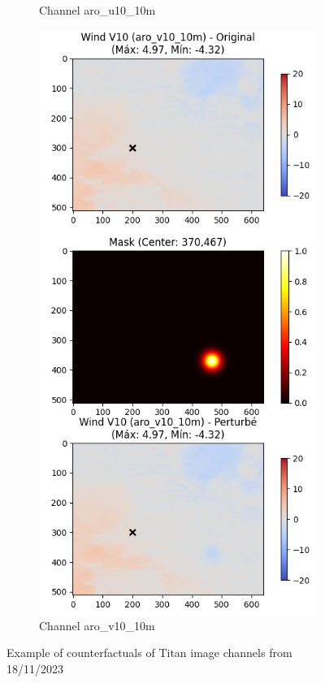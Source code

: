 \begin{figure}[h]
\begin{subfigure}[b]{0.32\textwidth}
        \caption{Channel aro\_u10\_10m}
        \label{fig:titan_perturbed_aro_u10}
    \end{subfigure}
    \hfill
    \begin{subfigure}[b]{0.32\textwidth}
        \includegraphics[width=\textwidth]{Images/titan_rain_perturbations/perturbed_c_v10_10m.png}
        \caption{Channel aro\_v10\_10m}
        \label{fig:titan_perturbed_aro_v10}
    \end{subfigure}
    \caption{Example of counterfactuals of Titan image channels from 18/11/2023}
    \label{fig:titan-rain-perturbations}
\end{figure}